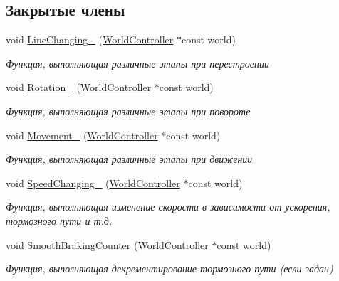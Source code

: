 \subsection*{Закрытые члены}
\begin{DoxyCompactItemize}
\item 
void \hyperlink{classrtm_1_1_vehicle_object_afbfb4168caaa0b61ff8cc18e0b52275c}{Line\+Changing\+\_\+} (\hyperlink{classrtm_1_1_world_controller}{World\+Controller} $\ast$const world)
\begin{DoxyCompactList}\small\item\em Функция, выполняющая различные этапы при перестроении \end{DoxyCompactList}\item 
void \hyperlink{classrtm_1_1_vehicle_object_a6961d03a7e8a805a9bd4422a8d0c1985}{Rotation\+\_\+} (\hyperlink{classrtm_1_1_world_controller}{World\+Controller} $\ast$const world)
\begin{DoxyCompactList}\small\item\em Функция, выполняющая различные этапы при повороте \end{DoxyCompactList}\item 
void \hyperlink{classrtm_1_1_vehicle_object_a0db960e75dbcb12d028b239e441ea0ed}{Movement\+\_\+} (\hyperlink{classrtm_1_1_world_controller}{World\+Controller} $\ast$const world)
\begin{DoxyCompactList}\small\item\em Функция, выполняющая различные этапы при движении \end{DoxyCompactList}\item 
void \hyperlink{classrtm_1_1_vehicle_object_aee8f792a78b9b1becf7a84c01157520b}{Speed\+Changing\+\_\+} (\hyperlink{classrtm_1_1_world_controller}{World\+Controller} $\ast$const world)
\begin{DoxyCompactList}\small\item\em Функция, выполняющая изменение скорости в зависимости от ускорения, тормозного пути и т.\+д. \end{DoxyCompactList}\item 
void \hyperlink{classrtm_1_1_vehicle_object_a76d76e5138ecb2188bb678a361ca58d7}{Smooth\+Braking\+Counter} (\hyperlink{classrtm_1_1_world_controller}{World\+Controller} $\ast$const world)
\begin{DoxyCompactList}\small\item\em Функция, выполняющая декрементирование тормозного пути (если задан) \end{DoxyCompactList}\end{DoxyCompactItemize}
